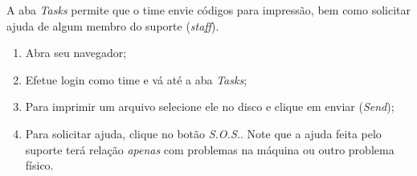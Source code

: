 \begin{enumerate}
    A aba \textit{Tasks} permite que o time envie códigos para impressão, bem como solicitar ajuda de algum membro do suporte (\textit{staff}).
    \begin{enumerate}
        \item Abra seu navegador;
        \item Efetue login como time e vá até a aba \textit{Tasks};
        \item Para imprimir um arquivo selecione ele no disco e clique em enviar (\textit{Send});
        \item Para solicitar ajuda, clique no botão \textit{S.O.S.}. Note que a ajuda feita pelo suporte terá relação \textit{apenas} com problemas na máquina ou outro problema físico.
    \end{enumerate}
\end{enumerate}

\newpage








